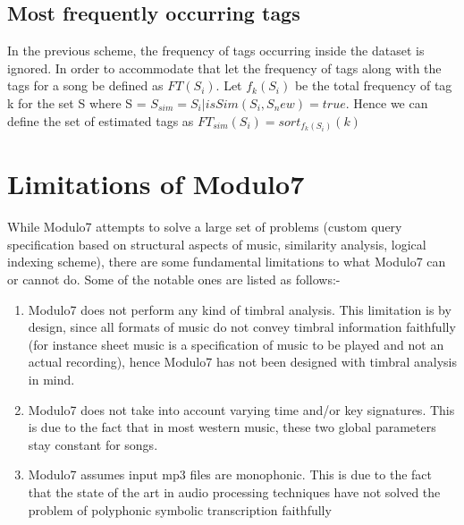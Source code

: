 \subsection{Most frequently occurring tags}

\noindent In the previous scheme, the frequency of tags occurring inside the dataset is ignored. In order to accommodate that let the frequency of tags along with the tags for a song be defined as $FT(S_i)$. Let $f_k(S_i)$ be the total frequency of tag k for the set S where S = $S_{sim} = {S_i | isSim(S_i, S_new) = true}.$ Hence we can define the set of estimated tags as $FT_{sim}(S_i) = sort_{f_k(S_i)}(k)$

\section{Limitations of Modulo7} 

\noindent While Modulo7 attempts to solve a large set of problems (custom query specification based on structural aspects of music, similarity analysis, logical indexing scheme), there are some fundamental limitations to what Modulo7 can or cannot do. Some of the notable ones are listed as follows:-

\begin{enumerate}
\item Modulo7 does not perform any kind of timbral analysis. This limitation is by design, since all formats of music do not convey timbral information faithfully (for instance sheet music is a specification of music to be played and not an actual recording), hence Modulo7 has not been designed with timbral analysis in mind.
\item Modulo7 does not take into account varying time and/or key signatures. This is due to the fact that in most western music, these two global parameters stay constant for songs.
\item Modulo7 assumes input mp3 files are monophonic. This is due to the fact that the state of the art in audio processing techniques have not solved the problem of polyphonic symbolic transcription faithfully  \cite{melextract}
\end{enumerate}
